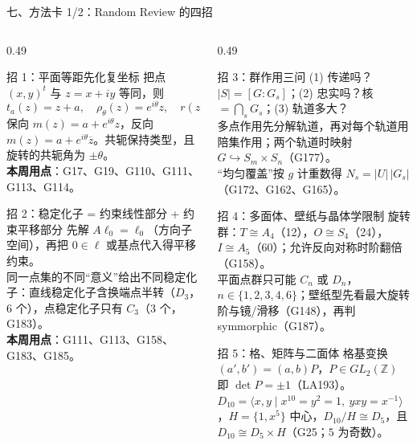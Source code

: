 \documentclass[aspectratio=169,10pt,fontset=none]{ctexbeamer}
\newcommand{\key}[1]{\textcolor{ink}{\bfseries #1}}
\begin{document}
\begin{frame}[t]{七、方法卡 1/2：Random Review 的四招}
  \label{sec:method1}
  \begin{columns}[T,onlytextwidth]
    \begin{column}{0.49\textwidth}
      \begin{block}{\footnotesize 招 1：平面等距先化复坐标}
        \scriptsize
        把点 $(x,y)^t$ 与 $z=x+iy$ 等同，则
        \[ t_a(z)=z+a,\quad \rho_\theta(z)=e^{i\theta}z,\quad r(z)=\overline z, \]
        保向 $m(z)=a+e^{i\theta}z$，反向 $m(z)=a+e^{i\theta}\overline z$。共轭保持类型，且旋转的共轭角为 $\pm\theta$。\\
        \key{本周用点}：G17、G19、G110、G111、G113、G114。
      \end{block}
      \begin{block}{\footnotesize 招 2：稳定化子 = 约束线性部分 + 约束平移部分}
        \scriptsize
        先解 $A\ell_0=\ell_0$（方向子空间），再把 $0\in\ell$ 或基点代入得平移约束。\\
        同一点集的不同“意义”给出不同稳定化子：直线稳定化子含换端点半转（$D_3$，$6$ 个），点稳定化子只有 $C_3$（$3$ 个，G183）。\\
        \key{本周用点}：G111、G113、G158、G183、G185。
      \end{block}
    \end{column}
    \begin{column}{0.49\textwidth}
      \begin{block}{\footnotesize 招 3：群作用三问}
        \scriptsize
        (1) 传递吗？$|S|=[G:G_s]$；(2) 忠实吗？核 $=\bigcap_{s}G_s$；(3) 轨道多大？\\
        多点作用先分解轨道，再对每个轨道用陪集作用；两个轨道时映射 $G\hookrightarrow S_{m}\times S_{n}$（G177）。\\
        “均匀覆盖”按 $g$ 计重数得 $N_s=|U|\,|G_s|$（G172、G162、G165）。
      \end{block}
      \begin{block}{\footnotesize 招 4：多面体、壁纸与晶体学限制}
        \scriptsize
        旋转群：$T\cong A_4$（12），$O\cong S_4$（24），$I\cong A_5$（60）；允许反向对称时阶翻倍（G158）。\\
        平面点群只可能 $C_n$ 或 $D_n$，$n\in\{1,2,3,4,6\}$；壁纸型先看最大旋转阶与镜/滑移（G148），再判 symmorphic（G187）。
      \end{block}
      \begin{block}{\footnotesize 招 5：格、矩阵与二面体}
        \scriptsize
        格基变换 $(a',b')=(a,b)P$，$P\in GL_2(\mathbb Z)$ 即 $\det P=\pm1$（LA193）。\\
        $D_{10}=\langle x,y\mid x^{10}=y^2=1,\ yxy=x^{-1}\rangle$，$H=\{1,x^5\}$ 中心，$D_{10}/H\cong D_5$，且 $D_{10}\cong D_5\times H$（G25；$5$ 为奇数）。
      \end{block}
    \end{column}
  \end{columns}
\end{frame}
\end{document}
